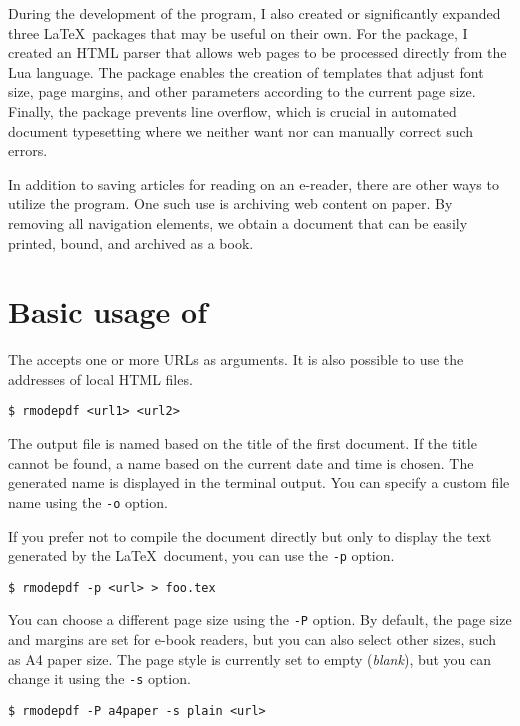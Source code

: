 \documentclass{ltugboat}
\newcommand\program[1]{\tbcode{#1}}
\begin{document}
During the development of the program, I also created or significantly expanded
three \LaTeX\ packages that may be useful on their own. For the 
package, I created an HTML parser that allows web pages to be processed
directly from the Lua language. The  package enables the
creation of templates that adjust font size, page margins, and other parameters
according to the current page size. Finally, the  package
prevents line overflow, which is crucial in automated document typesetting
where we neither want nor can manually correct such errors.

In addition to saving articles for reading on an e-reader, there are other ways
to utilize the \program{Rmodepdf} program. One such use is archiving web
content on paper. By removing all navigation elements, we obtain a document
that can be easily printed, bound, and archived as a book.

\section{Basic usage of \program{Rmodepdf}}

The \program{Rmodepdf} accepts one or more URLs as arguments. It is also
possible to use the addresses of local HTML files.

\begin{verbatim}
$ rmodepdf <url1> <url2>
\end{verbatim}


The output file is named based on the title of the first document. If the title
cannot be found, a name based on the current date and time is chosen. The
generated name is displayed in the terminal output. You can specify a custom
file name using the \texttt{-o} option.

If you prefer not to compile the document directly but only to display the text
generated by the \LaTeX\ document, you can use the \texttt{-p} option.

\begin{verbatim}
$ rmodepdf -p <url> > foo.tex
\end{verbatim}

You can choose a different page size using the \texttt{-P} option. By default,
the page size and margins are set for e-book readers, but you can also select
other sizes, such as A4 paper size. The page style is currently set to empty
(\textit{blank}), but you can change it using the \texttt{-s} option.

\begin{verbatim}
$ rmodepdf -P a4paper -s plain <url>
\end{verbatim}
\end{document}
